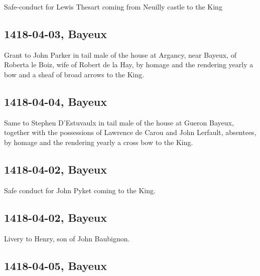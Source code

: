 \documentclass[a4paper,12pt,twoside]{book}
\begin{document}
                
                  Safe-conduct for Lewis Thesart coming from Neuilly castle to the King
               
                
                \subsection{1418-04-03, Bayeux}
                
                
                  Grant to John Parker in tail male of the house at Argancy, near Bayeux, of Roberta le Boiz, wife of Robert de la Hay, by homage and the rendering yearly a bow and a sheaf of broad arrows to the King.
               
                
                \subsection{1418-04-04, Bayeux}
                
                
                  Same to Stephen D’Estuvaulx in tail male of the house at Gueron Bayeux, together with the possessions of Lawrence de Carou and John Lerfault, absentees, by homage and the rendering yearly a cross bow to the King.
               
                
                \subsection{1418-04-02, Bayeux}
                
                
                  Safe conduct for John Pyket coming to the King.
               
                
                \subsection{1418-04-02, Bayeux}
                
                
                  Livery to Henry, son of John Baubignon.
               
                
                \subsection{1418-04-05, Bayeux}
                
\end{document}
